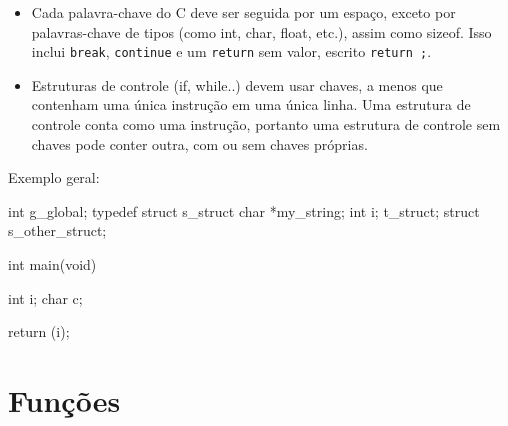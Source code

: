 \documentclass{42-pt}
\begin{document}
\begin{itemize}
            \item Cada palavra-chave do C deve ser seguida por um espaço, exceto por
            palavras-chave de tipos (como int, char, float, etc.),
            assim como sizeof. Isso inclui \texttt{break}, \texttt{continue} e um
            \texttt{return} sem valor, escrito \texttt{return ;}.

            \item Estruturas de controle (if, while..) devem usar chaves, a menos que contenham uma única
            instrução em uma única linha. Uma estrutura de controle conta como uma
            instrução, portanto uma estrutura de controle sem chaves pode conter
            outra, com ou sem chaves próprias.

            \end{itemize}

\vspace{1cm}

            Exemplo geral:
            \begin{42ccode}
int             g_global;
typedef struct  s_struct
{
    char    *my_string;
    int     i;
}               t_struct;
struct          s_other_struct;

int     main(void)
{
    int     i;
    char    c;

    return (i);
}
            \end{42ccode}
            \newpage

    \section{Funções}
\end{document}
